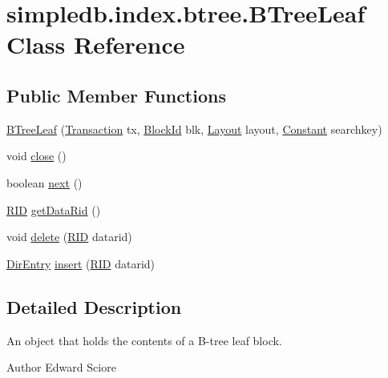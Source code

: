 \hypertarget{classsimpledb_1_1index_1_1btree_1_1BTreeLeaf}{}\section{simpledb.\+index.\+btree.\+B\+Tree\+Leaf Class Reference}
\label{classsimpledb_1_1index_1_1btree_1_1BTreeLeaf}
\subsection*{Public Member Functions}
\begin{DoxyCompactItemize}
\item 
\hyperlink{classsimpledb_1_1index_1_1btree_1_1BTreeLeaf_a2209d908e450ace4c77ae358fc5e6126}{B\+Tree\+Leaf} (\hyperlink{classsimpledb_1_1tx_1_1Transaction}{Transaction} tx, \hyperlink{classsimpledb_1_1file_1_1BlockId}{Block\+Id} blk, \hyperlink{classsimpledb_1_1record_1_1Layout}{Layout} layout, \hyperlink{classsimpledb_1_1query_1_1Constant}{Constant} searchkey)
\item 
void \hyperlink{classsimpledb_1_1index_1_1btree_1_1BTreeLeaf_a6e526d7dc8163bdd05d5012b82a10d84}{close} ()
\item 
boolean \hyperlink{classsimpledb_1_1index_1_1btree_1_1BTreeLeaf_a682895688ae67d02556041c1a5b83c6d}{next} ()
\item 
\hyperlink{classsimpledb_1_1record_1_1RID}{R\+ID} \hyperlink{classsimpledb_1_1index_1_1btree_1_1BTreeLeaf_a79b4f0a4d4e9480d9cfdeb64298a0b53}{get\+Data\+Rid} ()
\item 
void \hyperlink{classsimpledb_1_1index_1_1btree_1_1BTreeLeaf_a1fda546b620e8ec27ed9d33579926c6b}{delete} (\hyperlink{classsimpledb_1_1record_1_1RID}{R\+ID} datarid)
\item 
\hyperlink{classsimpledb_1_1index_1_1btree_1_1DirEntry}{Dir\+Entry} \hyperlink{classsimpledb_1_1index_1_1btree_1_1BTreeLeaf_aeeaf9ad926466091ff6dc03b62304145}{insert} (\hyperlink{classsimpledb_1_1record_1_1RID}{R\+ID} datarid)
\end{DoxyCompactItemize}


\subsection{Detailed Description}
An object that holds the contents of a B-\/tree leaf block. \begin{DoxyAuthor}{Author}
Edward Sciore 
\end{DoxyAuthor}


